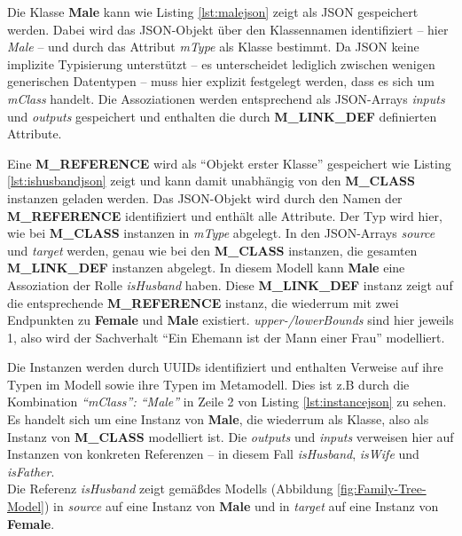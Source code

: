 

Die Klasse \textbf{Male} kann wie Listing \ref{lst:malejson} zeigt als JSON gespeichert werden. Dabei wird das JSON-Objekt \"uber den Klassennamen identifiziert -- hier \textit{Male} -- und durch das Attribut \textit{mType} als Klasse bestimmt. Da JSON keine implizite Typisierung unterstützt -- es unterscheidet lediglich zwischen wenigen generischen Datentypen -- muss hier explizit festgelegt werden, dass es sich um \textit{mClass} handelt. Die Assoziationen werden entsprechend als JSON-Arrays \textit{inputs} und \textit{outputs} gespeichert und enthalten die durch \textbf{M\_LINK\_DEF} definierten Attribute.



Eine \textbf{M\_REFERENCE} wird als "`Objekt erster Klasse"' gespeichert wie Listing \ref{lst:ishusbandjson} zeigt und kann damit unabhängig von den \textbf{M\_CLASS} instanzen geladen werden. Das JSON-Objekt wird durch den Namen der \textbf{M\_REFERENCE} identifiziert und enth\"alt alle Attribute. Der Typ wird hier, wie bei \textbf{M\_CLASS} instanzen in \textit{mType} abgelegt. In den JSON-Arrays \textit{source} und \textit{target} werden, genau wie bei den \textbf{M\_\-CLASS} instanzen, die gesamten \textbf{M\_LINK\_DEF} instanzen abgelegt. In diesem Modell kann \textbf{Male} eine Assoziation der Rolle \textit{isHusband} haben. Diese \textbf{M\_LINK\_DEF} instanz zeigt auf die entsprechende \textbf{M\_REFERENCE} instanz, die wiederrum mit zwei Endpunkten zu \textbf{Female} und \textbf{Male} existiert. \textit{upper-/lowerBounds} sind hier jeweils 1, also wird der Sachverhalt "`Ein Ehemann ist der Mann einer Frau"' modelliert.



Die Instanzen werden durch UUIDs identifiziert und enthalten Verweise auf ihre Typen im Modell sowie ihre Typen im Metamodell. Dies ist z.B durch die Kombination \textit{"`mClass"': "`Male"'} in Zeile 2 von Listing \ref{lst:instancejson} zu sehen. Es handelt sich um eine Instanz von \textbf{Male}, die wiederrum als Klasse, also als Instanz von \textbf{M\_CLASS} modelliert ist. Die \textit{outputs} und \textit{inputs} verweisen hier auf Instanzen von konkreten Referenzen -- in diesem Fall \textit{isHusband}, \textit{isWife} und \textit{isFather}.\\
Die Referenz \textit{isHusband} zeigt gem\"a\ss des Modells (Abbildung \ref{fig:Family-Tree-Model}) in \textit{source} auf eine Instanz von \textbf{Male} und in \textit{target} auf eine Instanz von \textbf{Female}.

